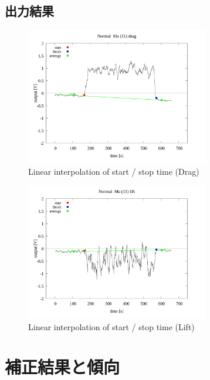 \documentclass[twocolumn,a4j]{jsarticle}
\begin{document}
\subsection{出力結果}
\begin{figure}[htbp]
    \footnotesize
    \begin{center}
        \includegraphics[width=80mm]{images/Normal_ma(11)_drag_03.png}
        \caption{Linear interpolation of start / stop time (Drag)}
    \end{center}
\end{figure}
\begin{figure}[htbp]
    \footnotesize
    \begin{center}
        \includegraphics[width=80mm]{images/Normal_ma(11)_lift_03.png}
        \caption{Linear interpolation of start / stop time (Lift)}
    \end{center}
\end{figure}
\newpage
\section{補正結果と傾向}
\end{document}
